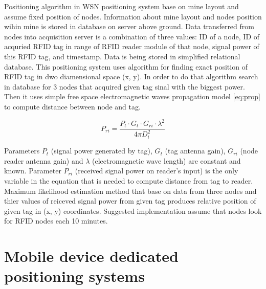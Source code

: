 \documentclass[../main.tex]{subfiles}
\begin{document}
Positioning algorithm in WSN positioning system base on mine layout and assume fixed position of nodes. Information about mine layout and nodes position wihin mine is stored in database on server above ground. Data transferred from nodes into acquisition server is a combination of three values: ID of a node, ID of acquried RFID tag in range of RFID reader module of that node, signal power of this RFID tag, and timestamp. Data is being stored in simplified relational database. This positioning system uses algorithm for finding exact position of RFID tag in dwo diamensional space (x, y). In order to do that algorithm search in database for 3 nodes that acquired given tag sinal with the biggest power. Then it uses simple free space electromagnetic waves propagation model \eqref{eq:prop} to compute distance between node and tag.

\begin{equation}
\label{eq:prop}
P_{ri}=\frac{P_t \cdot G_t \cdot G_{ri} \cdot \lambda^2}{4\pi D_i^2}
\end{equation}

Parameters $P_t$ (signal power generated by tag), $G_t$ (tag antenna gain), $G_{ri}$ (node reader antenna gain) and $\lambda$ (electromagnetic wave length) are constant and known. Parameter ${P_{ri}}$ (received signal power on reader's input) is the only variable in the equation that is needed to compute distance from tag to reader. Maximum likelihood estimation method that base on data from three nodes and thier values of reiceved signal power from given tag produces relative position of given tag in (x, y) coordinates. Suggested implementation \cite{WSN_tracking} assume that nodes look for RFID nodes each 10 minutes.


\section{Mobile device dedicated positioning systems} %
\label{sec:mobile_device_dedicated_positioning_systems}
\end{document}
